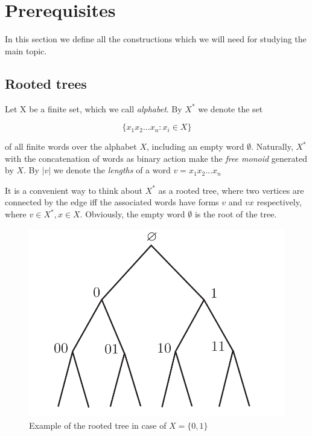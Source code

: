 \documentclass[a4paper,12pt]{amsart}
\begin{document}
	
	\section{Prerequisites}
	
	In this section we define all the constructions which we will need for studying the main topic.
	
	\subsection{Rooted trees}
	
	Let X be a finite set, which we call \textit{alphabet}. By $X^*$ we denote the set 
	
	$$\{x_1 x_2 \dots x_n : x_i \in X \}$$
	
	of all finite words over the alphabet $X$, including an empty word $\emptyset$. Naturally, $X^*$ with the concatenation of words as binary action make the \textit{free monoid} generated by $X$. By $|v|$ we denote the \textit{lengths} of a word $v = x_1 x_2 \dots x_n$
	
	It is a convenient way to think about $X^*$ as a rooted tree, where two vertices are connected by the edge iff the associated words have forms $v$ and $vx$ respectively, where $v \in X^*, x \in X$. Obviously, the empty word $\emptyset$ is the root of the tree.
	
	
	\begin{figure}[h]
		\includegraphics[scale=0.4]{rooted2tree.png}
		\caption{Example of the rooted tree in case of $X = \{0,1\}$}
	\end{figure}
		
\end{document}
